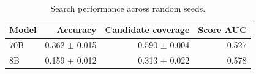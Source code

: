 \begin{table}[ht]
\centering
\caption{Search performance across random seeds.}
\begin{tabular}{lrrr}
\toprule
Model & Accuracy & Candidate coverage & Score AUC \\
\midrule
70B & 0.362 $\pm$ 0.015 & 0.590 $\pm$ 0.004 & 0.527 \\
8B & 0.159 $\pm$ 0.012 & 0.313 $\pm$ 0.022 & 0.578 \\
\bottomrule
\end{tabular}
\end{table}
